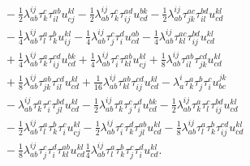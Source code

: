\begin{equation}
\begin{aligned}
    \\
    &\qquad
    - \frac{1}{2}\lambda^{ij}_{ab} \tau^{c}_{k} \tau^{ab}_{il} u^{kl}_{cj}
    - \frac{1}{2}\lambda^{ij}_{ab} \tau^{c}_{k} \tau^{ad}_{ij} u^{bk}_{cd}
    - \frac{1}{2}\lambda^{ij}_{ab} \tau^{ac}_{jk} \tau^{bd}_{il} u^{kl}_{cd}
    \\
    &\qquad
    - \frac{1}{4}\lambda^{ij}_{ab} \tau^{a}_{l} \tau^{b}_{k} u^{kl}_{ij}
    - \frac{1}{4}\lambda^{ij}_{ab} \tau^{c}_{j} \tau^{d}_{i} u^{ab}_{cd}
    - \frac{1}{4}\lambda^{ij}_{ab} \tau^{ac}_{kl} \tau^{bd}_{ij} u^{kl}_{cd}
    \\
    &\qquad
    + \frac{1}{4}\lambda^{ij}_{ab} \tau^{a}_{k} \tau^{cd}_{ij} u^{bk}_{cd}
    + \frac{1}{4}\lambda^{ij}_{ab} \tau^{c}_{i} \tau^{ab}_{kl} u^{kl}_{cj}
    + \frac{1}{8}\lambda^{ij}_{ab} \tau^{ab}_{il} \tau^{cd}_{jk} u^{kl}_{cd}
    \\
    &\qquad
    + \frac{1}{8}\lambda^{ij}_{ab} \tau^{ab}_{jk} \tau^{cd}_{il} u^{kl}_{cd}
    + \frac{1}{16}\lambda^{ij}_{ab} \tau^{ab}_{kl} \tau^{cd}_{ij} u^{kl}_{cd}
    - \lambda^{i}_{a} \tau^{a}_{k} \tau^{b}_{j} \tau^{c}_{i} u^{jk}_{bc}
    \\
    &\qquad
    - \lambda^{ij}_{ab} \tau^{a}_{k} \tau^{c}_{i} \tau^{bd}_{jl} u^{kl}_{cd}
    - \frac{1}{2}\lambda^{ij}_{ab} \tau^{a}_{k} \tau^{c}_{j} \tau^{d}_{i} u^{bk}_{cd}
    - \frac{1}{2}\lambda^{ij}_{ab} \tau^{a}_{k} \tau^{c}_{l} \tau^{bd}_{ij} u^{kl}_{cd}
      \\
    &\qquad
    - \frac{1}{2}\lambda^{ij}_{ab} \tau^{a}_{l} \tau^{b}_{k} \tau^{c}_{i} u^{kl}_{cj}
    - \frac{1}{2}\lambda^{ij}_{ab} \tau^{c}_{i} \tau^{d}_{k} \tau^{ab}_{jl} u^{kl}_{cd}
    - \frac{1}{8}\lambda^{ij}_{ab} \tau^{a}_{l} \tau^{b}_{k} \tau^{cd}_{ij} u^{kl}_{cd}
    \\
    &\qquad
    - \frac{1}{8}\lambda^{ij}_{ab} \tau^{c}_{j} \tau^{d}_{i} \tau^{ab}_{kl} u^{kl}_{cd}
    \frac{1}{4}\lambda^{ij}_{ab} \tau^{a}_{l} \tau^{b}_{k}
    \tau^{c}_{j} \tau^{d}_{i} u^{kl}_{cd}.
    \end{aligned}
\end{equation}
